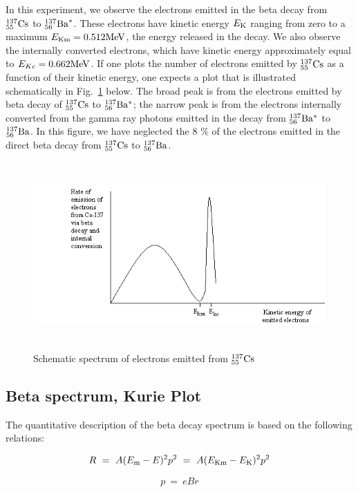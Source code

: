 \documentclass{article}
\newcommand{\cs}{${}^{137}_{55}{\rm Cs}$ }
\newcommand{\ba}{${}^{137}_{56}{\rm Ba }$}
\newcommand{\bam}{${}^{137}_{56}{\rm Ba^* }$}
\begin{document}
In this experiment, we observe the electrons emitted in the beta
decay from \cs to ${}^{137}_{56}{\rm Ba}^*$.  These electrons have kinetic energy
$E_{\rm K}$ ranging from zero to a maximum 
$E_{\rm Km} = 0.512 {\rm MeV}$, the energy released
in the decay.  We also observe the internally converted electrons,
which have kinetic energy approximately equal to
$E_{Kc} = 0.662 {\rm MeV}$.  If one plots the
number of electrons emitted by \cs as a function of their kinetic
energy, one expects a plot that is illustrated schematically in Fig.~\ref{fig:Espectrum}
below.  The broad peak is from the electrons emitted by beta decay of
\cs to \bam;  the narrow peak is from the electrons internally
converted from the gamma ray photons emitted in the decay from \bam
to \ba.  In this figure, we have neglected the 8 \% of the electrons emitted 
in the direct beta decay from \cs to \ba.
\begin{figure}
\begin{centering}
\includegraphics[width=5.889in,height=2.8189in]{images/beta-img2.png} 
\caption{Schematic spectrum of electrons emitted from \cs}
\label{fig:Espectrum}
\end{centering}
\end{figure}

\subsection{Beta spectrum, Kurie Plot}

The quantitative description of the beta decay spectrum is based on the
following relations:

\begin{equation}
R~=~A(E_{\rm m} - E)^2p^2~=~A(E_{\rm Km} - E_{\rm K})^2p^2
\label{eq:1}
\end{equation}

\begin{equation}
p~=~e B r
\label{eq:2}
\end{equation}
\end{document}
